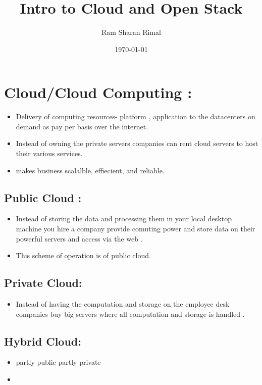 \documentclass[11pt]{article}
\author{Ram Sharan Rimal  }
\date{\today}
\title{Intro to Cloud and Open Stack}
\begin{document}
\maketitle
\tableofcontents


\section{Cloud/Cloud Computing :}
\label{sec:org2491399}
\begin{itemize}
\item Delivery of computing resources- platform , application to the datacenters
on demand as pay per basis over the internet.
\item Instead of owning the private servers companies can rent cloud servers to host
their various services.
\item makes business scalalble, effiecient, and reliable.
\end{itemize}

\subsection{Public Cloud :}
\label{sec:org96a0960}
\begin{itemize}
\item Instead of storing the data and processing them in your local desktop machine
you hire a company provide comuting power and   store data on their powerful
servers and access via the web .
\item This scheme of operation is of public cloud.
\end{itemize}


\subsection{Private Cloud:}
\label{sec:org2e2a400}
\begin{itemize}
\item Instead of having the computation and storage on the employee desk companies
buy big servers where all computation and storage is handled .
\end{itemize}

\subsection{Hybrid Cloud:}
\label{sec:org9f0b3c0}
\begin{itemize}
\item partly public partly private
\item 
\end{itemize}
\end{document}
